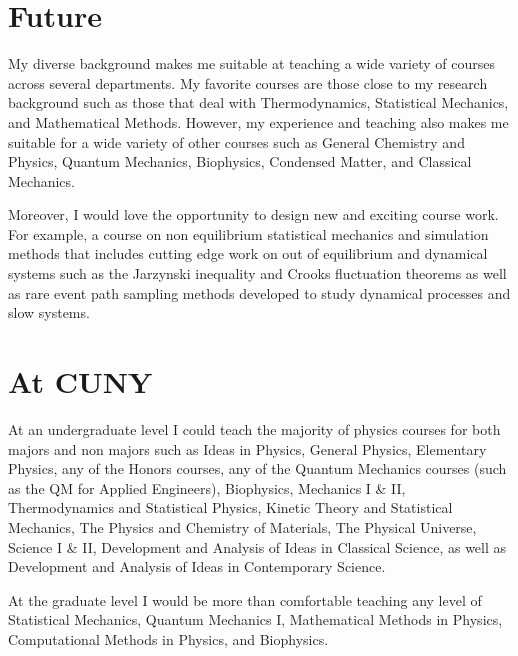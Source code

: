\documentclass[11pt]{article}
\begin{document}
\section{Future} %

My diverse background makes me suitable at teaching a wide variety of courses across several departments.  My favorite courses are those close to my research background such as those that deal with Thermodynamics, Statistical Mechanics, and Mathematical Methods.  However, my experience and teaching also makes me suitable for a wide variety of other courses such as General Chemistry and Physics, Quantum Mechanics, Biophysics, Condensed Matter, and Classical Mechanics.

Moreover, I would love the opportunity to design new and exciting course work.  For example, a course on non equilibrium statistical mechanics and simulation methods that includes cutting edge work on out of equilibrium and dynamical systems such as the Jarzynski inequality and Crooks fluctuation theorems as well as rare event path sampling methods developed to study dynamical processes and slow systems.

\section{At CUNY} %

At an undergraduate level I could teach the majority of physics courses for both majors and non majors such as Ideas in Physics, General Physics, Elementary Physics, any of the Honors courses, any of the Quantum Mechanics courses (such as the QM for Applied Engineers), Biophysics, Mechanics I \& II, Thermodynamics and Statistical Physics, Kinetic Theory and Statistical Mechanics, The Physics and Chemistry of Materials, The Physical Universe, Science I \& II, Development and Analysis of Ideas in Classical Science, as well as Development and Analysis of Ideas in Contemporary Science.

At the graduate level I would be more than comfortable teaching any level of Statistical Mechanics, Quantum Mechanics I, Mathematical Methods in Physics, Computational Methods in Physics, and Biophysics.
\end{document}
